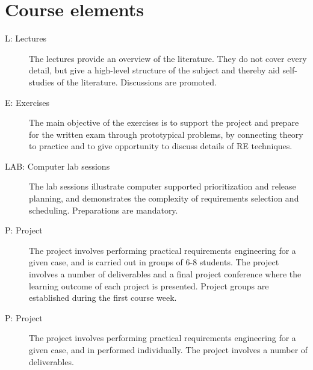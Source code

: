 \newpage

\section{Course elements}
\begin{description}
\item[L: Lectures] The lectures provide an overview of the literature. They do not cover every detail, but give a high-level structure of the subject and thereby aid self-studies of the literature. Discussions are promoted.
\item[E: Exercises] The main objective of the exercises is to support the project and prepare for the written exam through prototypical problems, by connecting theory to practice and to give opportunity to discuss details of RE techniques.
\item[LAB: Computer lab sessions] The lab sessions illustrate computer supported
prioritization and release planning, and demonstrates the complexity of requirements selection and scheduling. Preparations are mandatory. 
\ifteknolog
	\item[P: Project] The project involves performing practical requirements engineering for a given case, and is carried out in groups of 6-8 students. The project involves a number of deliverables and a final project conference where the learning outcome of each project is presented. Project groups are established during the first course week.
\else
	\item[P: Project] The project involves performing practical requirements engineering for a given case, and in performed individually. The project involves a number of deliverables.
\fi

\end{description}




